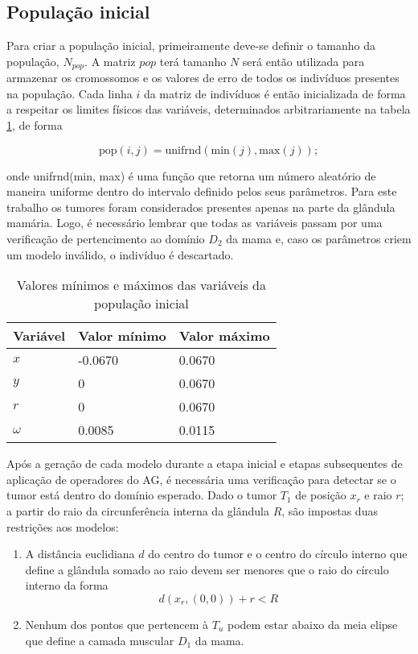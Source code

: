 \subsection{População inicial}
Para criar a população inicial, primeiramente deve-se definir o tamanho da população, $N_{pop}$. A matriz $pop$ terá tamanho $N$ será então utilizada para armazenar os cromossomos e os valores de erro de todos os indivíduos presentes na população. Cada linha $i$ da matriz de indivíduos é então inicializada de forma a respeitar os limites físicos das variáveis, determinados arbitrariamente na tabela \ref{tab:minmax}, de forma

\begin{equation}
\textrm{pop}(i,j) = \textrm{unifrnd}(\textrm{min}(j), \textrm{max}(j));
\end{equation}

\noindent onde unifrnd(min, max) é uma função que retorna um número aleatório de maneira uniforme dentro do intervalo definido pelos seus parâmetros. Para este trabalho os tumores foram considerados presentes apenas na parte da glândula mamária. Logo, é necessário lembrar que todas as variáveis passam por uma verificação de pertencimento ao domínio $D_2$ da mama e, caso os parâmetros criem um modelo inválido, o indivíduo é descartado.

\begin{table}[!ht]
\centering
\begin{tabularx}{0.5\textwidth}{lll}
\hline Variável & Valor mínimo & Valor máximo \\ \hline
	$x$ & -0.0670 & 0.0670 \\
	$y$ & 0 & 0.0670 \\
	$r$ & 0 & 0.0670 \\
	$\omega$ & 0.0085 & 0.0115 \\ \hline
\end{tabularx}
\caption{Valores mínimos e máximos das variáveis da população inicial}
\label{tab:minmax}
\end{table}

\label{sec:verify}
Após a geração de cada modelo durante a etapa inicial e etapas subsequentes de aplicação de operadores do AG, é necessária uma verificação para detectar se o tumor está dentro do domínio esperado. Dado o tumor $T_1$ de posição $x_r$ e raio $r$; a partir do raio da circunferência interna da glândula $R$, são impostas duas restrições aos modelos: \begin{enumerate}
	\item A distância euclidiana $d$ do centro do tumor e o centro do círculo interno que define a glândula somado ao raio devem ser menores que o raio do círculo interno da forma
	\begin{equation}
		d(x_r,(0,0)) + r < R
	\end{equation}

	\item Nenhum dos pontos que pertencem à $T_u$ podem estar abaixo da meia elipse que define a camada muscular $D_1$ da mama.
\end{enumerate}

